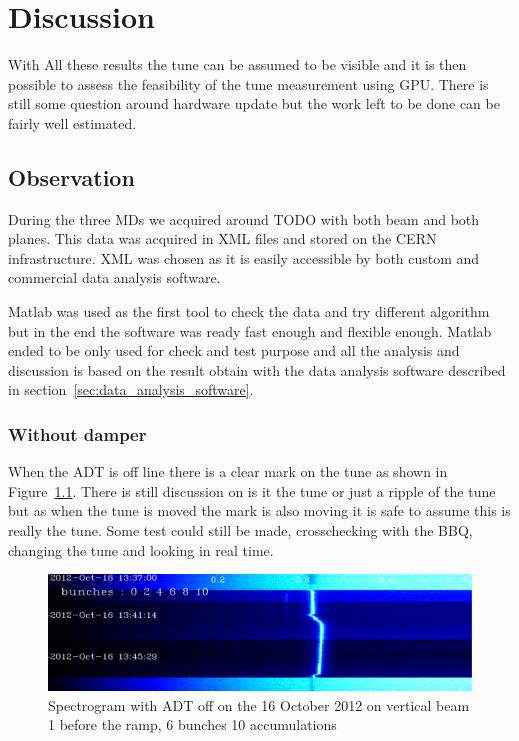 
\chapter{Discussion}

With All these results the \gls{tune} can be assumed to be visible and it is then possible to assess the feasibility of the tune measurement using \gls{GPU}. There is still some question around hardware update but the work left to be done can be fairly well estimated.

\section{Observation}

During the three \glspl{MD} we acquired around TODO with both beam and both planes. This data was acquired in XML files and stored on the \gls{CERN} infrastructure. XML was chosen as it is easily accessible by both custom and commercial data analysis software.

Matlab was used as the first tool to check the data and try different algorithm but in the end the software was ready fast enough and flexible enough. Matlab ended to be only used for check and test purpose and all the analysis and discussion is based on the result obtain with the data analysis software described in section~\ref{sec:data_analysis_software}.

\subsection{Without damper}

When the \gls{ADT} is off line there is a clear mark on the tune as shown in Figure~\ref{fig:adt_off}. There is still discussion on is it the tune or just a ripple of the tune but as when the tune is moved the mark is also moving it is safe to assume this is really the tune. Some test could still be made, crosschecking with the \gls{BBQ}, changing the tune and looking in real time.

\begin{figure}[H]
\caption{Spectrogram with ADT off on the 16 October 2012 on vertical beam 1 before the ramp, 6 bunches 10 accumulations}
\label{fig:adt_off}
\centering
\includegraphics[scale=0.3]{md-121016-vb1-m1-6bunches-10acc-1337-1349-ADT-off.pdf}
\end{figure}

